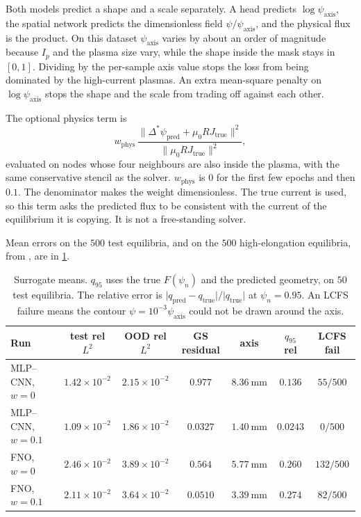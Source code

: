 \documentclass[11pt,a4paper,oneside,openany]{book}
\newcommand{\code}{\path}
\numberwithin{equation}{chapter}
\newcommand{\Dstar}{\Delta^{*}}
\newcommand{\psin}{\psi_{n}}
\newcommand{\Ip}{I_{p}}
\theoremstyle{definition}
\begin{document}
Both models predict a shape and a scale separately. A head predicts \(\log\psi_{\mathrm{axis}}\), the spatial network predicts the dimensionless field \(\psi/\psi_{\mathrm{axis}}\), and the physical flux is the product. On this dataset \(\psi_{\mathrm{axis}}\) varies by about an order of magnitude because \(\Ip\) and the plasma size vary, while the shape inside the mask stays in \([0,1]\). Dividing by the per-sample axis value stops the loss from being dominated by the high-current plasmas. An extra mean-square penalty on \(\log\psi_{\mathrm{axis}}\) stops the shape and the scale from trading off against each other.

The optional physics term is
\begin{equation}
\label{eq:wphys}
w_{\mathrm{phys}}\,
\frac{\lVert\Dstar\psi_{\mathrm{pred}}+\mu_{0} R J_{\mathrm{true}}\rVert^{2}}
{\lVert\mu_{0} R J_{\mathrm{true}}\rVert^{2}},
\end{equation}
evaluated on nodes whose four neighbours are also inside the plasma, with the same conservative stencil as the solver. \(w_{\mathrm{phys}}\) is \(0\) for the first few epochs and then \(0.1\). The denominator makes the weight dimensionless. The true current is used, so this term asks the predicted flux to be consistent with the current of the equilibrium it is copying. It is not a free-standing solver.

Mean errors on the \(500\) test equilibria, and on the \(500\) high-elongation equilibria, from \code{outputs/surrogate/summary.json}, are in \cref{tab:surr}.

\begin{table}[htbp]
\centering
\caption{Surrogate means. \(q_{95}\) uses the true \(F(\psin)\) and the predicted geometry, on \(50\) test equilibria. The relative error is \(\lvert q_{\mathrm{pred}}-q_{\mathrm{true}}\rvert/\lvert q_{\mathrm{true}}\rvert\) at \(\psin=0.95\). An LCFS failure means the contour \(\psi=10^{-3}\psi_{\mathrm{axis}}\) could not be drawn around the axis.}
\label{tab:surr}
\footnotesize
\setlength{\tabcolsep}{4.2pt}
\begin{tabular}{@{}lcccccc@{}}
\toprule
Run & test rel \(L^{2}\) & OOD rel \(L^{2}\) & GS residual & axis & \(q_{95}\) rel & LCFS fail \\
\midrule
MLP--CNN, \(w=0\) & \(1.42\times 10^{-2}\) & \(2.15\times 10^{-2}\) & \(0.977\) & \(\qty{8.36}{\milli\metre}\) & \(0.136\) & \(55/500\) \\
MLP--CNN, \(w=0.1\) & \(1.09\times 10^{-2}\) & \(1.86\times 10^{-2}\) & \(0.0327\) & \(\qty{1.40}{\milli\metre}\) & \(0.0243\) & \(0/500\) \\
FNO, \(w=0\) & \(2.46\times 10^{-2}\) & \(3.89\times 10^{-2}\) & \(0.564\) & \(\qty{5.77}{\milli\metre}\) & \(0.260\) & \(132/500\) \\
FNO, \(w=0.1\) & \(2.11\times 10^{-2}\) & \(3.64\times 10^{-2}\) & \(0.0510\) & \(\qty{3.39}{\milli\metre}\) & \(0.274\) & \(82/500\) \\
\bottomrule
\end{tabular}
\end{table}
\end{document}
